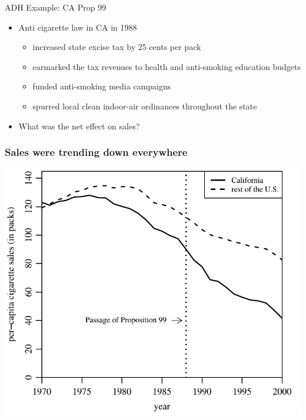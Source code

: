 \begin{frame}{ADH Example: CA Prop 99}
  \begin{itemize}
  \item Anti cigarette law in CA in 1988
  \begin{itemize}
    \item increased state excise tax by 25 cents per pack
    \item earmarked the tax revenues to health and anti-smoking education budgets
    \item funded anti-smoking media campaigns
    \item spurred local clean indoor-air ordinances throughout the state
  \end{itemize}
  \item What was the net effect on sales?
  \end{itemize}
\end{frame}

\begin{frame}
  \frametitle{Sales were trending down everywhere}
  \begin{center}
    \includegraphics[width=.85\textwidth]{./resources/ADHCAvsUS}
  \end{center}  
\end{frame}

